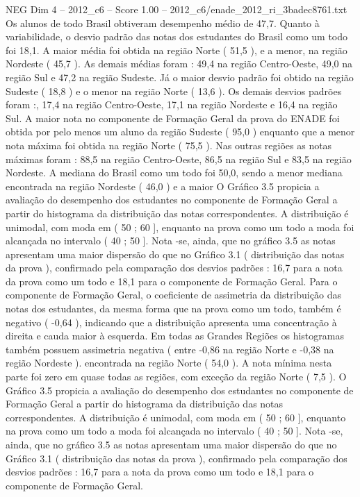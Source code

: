 \begin{textsample}{NEG Dim 4 – 2012\_c6 – Score 1.00 – 2012\_c6/enade\_2012\_ri\_3badec8761.txt}
Os alunos de todo Brasil obtiveram desempenho médio de 47,7.
Quanto à variabilidade, o desvio padrão das notas dos estudantes do Brasil como um todo foi 18,1.
A maior média foi obtida na região Norte ( 51,5 ), e a menor, na região Nordeste ( 45,7 ).
As demais médias foram : 49,4 na região Centro-Oeste, 49,0 na região Sul e 47,2 na região Sudeste.
Já o maior desvio padrão foi obtido na região Sudeste ( 18,8 ) e o menor na região Norte ( 13,6 ).
Os demais desvios padrões foram :, 17,4 na região Centro-Oeste, 17,1 na região Nordeste e 16,4 na região Sul.
A maior nota no componente de Formação Geral da prova do ENADE foi obtida por pelo menos um aluno da região Sudeste ( 95,0 ) enquanto que a menor nota máxima foi obtida na região Norte ( 75,5 ).
Nas outras regiões as notas máximas foram : 88,5 na região Centro-Oeste, 86,5 na região Sul e 83,5 na região Nordeste.
A mediana do Brasil como um todo foi 50,0, sendo a menor mediana encontrada na região Nordeste ( 46,0 ) e a maior O Gráfico 3.5 propicia a avaliação do desempenho dos estudantes no componente de Formação Geral a partir do histograma da distribuição das notas correspondentes.
A distribuição é unimodal, com moda em ( 50 ; 60 ], enquanto na prova como um todo a moda foi alcançada no intervalo ( 40 ; 50 ].
Nota -se, ainda, que no gráfico 3.5 as notas apresentam uma maior dispersão do que no Gráfico 3.1 ( distribuição das notas da prova ), confirmado pela comparação dos desvios padrões : 16,7 para a nota da prova como um todo e 18,1 para o componente de Formação Geral.
Para o componente de Formação Geral, o coeficiente de assimetria da distribuição das notas dos estudantes, da mesma forma que na prova como um todo, também é negativo ( -0,64 ), indicando que a distribuição apresenta uma concentração à direita e cauda maior à esquerda.
Em todas as Grandes Regiões os histogramas também possuem assimetria negativa ( entre -0,86 na região Norte e -0,38 na região Nordeste ). encontrada na região Norte ( 54,0 ).
A nota mínima nesta parte foi zero em quase todas as regiões, com exceção da região Norte ( 7,5 ).
O Gráfico 3.5 propicia a avaliação do desempenho dos estudantes no componente de Formação Geral a partir do histograma da distribuição das notas correspondentes.
A distribuição é unimodal, com moda em ( 50 ; 60 ], enquanto na prova como um todo a moda foi alcançada no intervalo ( 40 ; 50 ].
Nota -se, ainda, que no gráfico 3.5 as notas apresentam uma maior dispersão do que no Gráfico 3.1 ( distribuição das notas da prova ), confirmado pela comparação dos desvios padrões : 16,7 para a nota da prova como um todo e 18,1 para o componente de Formação Geral.

\end{textsample}
